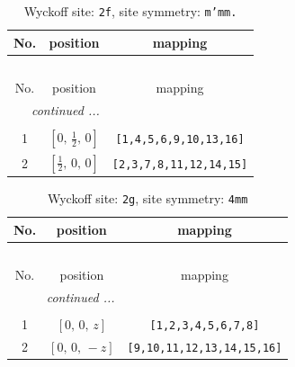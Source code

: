 \documentclass[fleqn,8pt]{jsarticle}
\begin{document}
\renewcommand{\arraystretch}{1.2}
\begin{longtable}{ccc}
\caption{Wyckoff site: {\tt 2f}, site symmetry: {\tt m'mm.}}
 \\
 \hline \hline
No. & position & mapping \\ \hline \endfirsthead

\multicolumn{2}{l}{\tablename\ \thetable{}} \\
 \hline \hline
No. & position & mapping \\ \hline \endhead

 \hline \hline
\multicolumn{2}{r}{\footnotesize\it continued ...} \\ \endfoot

 \hline \hline
\multicolumn{2}{r}{} \\ \endlastfoot

1 & $\left[ 0,\, \frac{1}{2},\, 0 \right]$ & {\tt [1,4,5,6,9,10,13,16]} \\ \hline
2 & $\left[ \frac{1}{2},\, 0,\, 0 \right]$ & {\tt [2,3,7,8,11,12,14,15]} \\
\end{longtable}
\renewcommand{\arraystretch}{1.2}
\begin{longtable}{ccc}
\caption{Wyckoff site: {\tt 2g}, site symmetry: {\tt 4mm}}
 \\
 \hline \hline
No. & position & mapping \\ \hline \endfirsthead

\multicolumn{2}{l}{\tablename\ \thetable{}} \\
 \hline \hline
No. & position & mapping \\ \hline \endhead

 \hline \hline
\multicolumn{2}{r}{\footnotesize\it continued ...} \\ \endfoot

 \hline \hline
\multicolumn{2}{r}{} \\ \endlastfoot

1 & $\left[ 0,\, 0,\, z \right]$ & {\tt [1,2,3,4,5,6,7,8]} \\ \hline
2 & $\left[ 0,\, 0,\, - z \right]$ & {\tt [9,10,11,12,13,14,15,16]} \\
\end{longtable}
\renewcommand{\arraystretch}{1.2}
\end{document}
